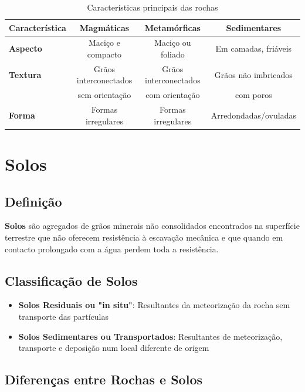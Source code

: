 \documentclass[12pt,a4paper,twoside]{book}
\begin{document}
\begin{table}[h]
\centering
\begin{tabular}{|l|c|c|c|}
\hline
\textbf{Característica} & \textbf{Magmáticas} & \textbf{Metamórficas} & \textbf{Sedimentares} \\
\hline
\textbf{Aspecto} & Maciço e compacto & Maciço ou foliado & Em camadas, friáveis \\
\hline
\textbf{Textura} & Grãos interconectados & Grãos interconectados & Grãos não imbricados \\
& sem orientação & com orientação & com poros \\
\hline
\textbf{Forma} & Formas irregulares & Formas irregulares & Arredondadas/ovuladas \\
\hline
\end{tabular}
\caption{Características principais das rochas}
\label{tab:rochas}
\end{table}

\section{Solos}

\subsection{Definição}

\textbf{Solos} são agregados de grãos minerais não consolidados encontrados na superfície terrestre 
que não oferecem resistência à escavação mecânica e que quando em contacto prolongado com a água 
perdem toda a resistência.

\subsection{Classificação de Solos}

\begin{itemize}
    \item \textbf{Solos Residuais ou "in situ"}: Resultantes da meteorização da rocha sem transporte 
    das partículas
    \item \textbf{Solos Sedimentares ou Transportados}: Resultantes de meteorização, transporte e 
    deposição num local diferente de origem
\end{itemize}

\subsection{Diferenças entre Rochas e Solos}
\end{document}
